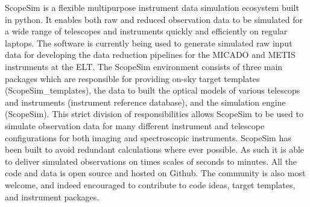 
ScopeSim is a flexible multipurpose instrument data simulation ecosystem built in python.
It enables both raw and reduced observation data to be simulated for a wide range of telescopes and instruments quickly and efficiently on regular laptops.
The software is currently being used to generate simulated raw input data for developing the data reduction pipelines for the MICADO and METIS instruments at the ELT.
The ScopeSim environment consists of three main packages which are responsible for providing on-sky target templates (ScopeSim\_templates), the data to built the optical models of various telescops and instruments (instrument reference database), and the simulation engine (ScopeSim).
This strict division of responsibilities allows ScopeSim to be used to simulate observation data for many different instrument and telescope configurations for both imaging and spectroscopic instruments.
ScopeSim has been built to avoid redundant calculations where ever possible.
As such it is able to deliver simulated observations on times scales of seconds to minutes.
All the code and data is open source and hosted on Github.
The community is also most welcome, and indeed encouraged to contribute to code ideas, target templates, and instrument packages.
